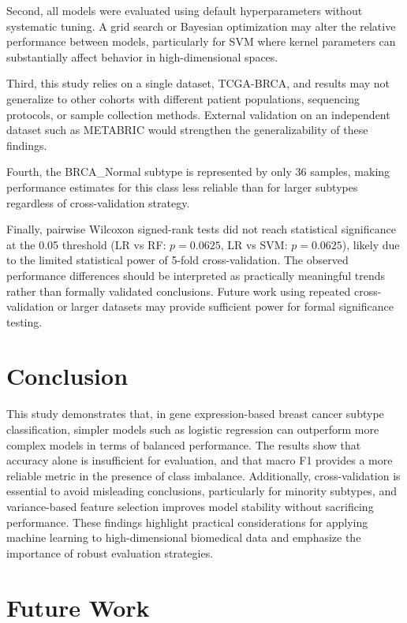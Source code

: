 \documentclass[10pt,twocolumn,letterpaper]{article}
\begin{document}
Second, all models were evaluated using default hyperparameters without systematic tuning. A grid search or Bayesian optimization may alter the relative performance between models, particularly for SVM where kernel parameters can substantially affect behavior in high-dimensional spaces.

Third, this study relies on a single dataset, TCGA-BRCA, and results may not generalize to other cohorts with different patient populations, sequencing protocols, or sample collection methods. External validation on an independent dataset such as METABRIC would strengthen the generalizability of these findings.

Fourth, the BRCA\_Normal subtype is represented by only 36 samples, making performance estimates for this class less reliable than for larger subtypes regardless of cross-validation strategy.

Finally, pairwise Wilcoxon signed-rank tests did not reach statistical significance at the 0.05 threshold (LR vs RF: $p = 0.0625$, LR vs SVM: $p = 0.0625$), likely due to the limited statistical power of 5-fold cross-validation. The observed performance differences should be interpreted as practically meaningful trends rather than formally validated conclusions. Future work using repeated cross-validation or larger datasets may provide sufficient power for formal significance testing.

\FloatBarrier
\section{Conclusion}

This study demonstrates that, in gene expression-based breast cancer subtype classification, simpler models such as logistic regression can outperform more complex models in terms of balanced performance. The results show that accuracy alone is insufficient for evaluation, and that macro F1 provides a more reliable metric in the presence of class imbalance. Additionally, cross-validation is essential to avoid misleading conclusions, particularly for minority subtypes, and variance-based feature selection improves model stability without sacrificing performance. These findings highlight practical considerations for applying machine learning to high-dimensional biomedical data and emphasize the importance of robust evaluation strategies.

\FloatBarrier
\section{Future Work}
\end{document}
